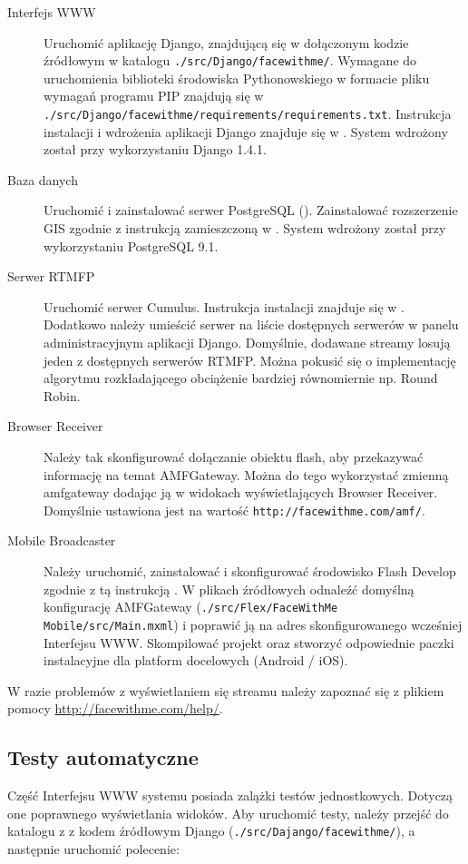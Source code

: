 \begin{description}
    \item[Interfejs WWW] Uruchomić aplikację Django, znajdującą się w dołączonym kodzie źródłowym w katalogu \texttt{./src/Django/facewithme/}. Wymagane do uruchomienia biblioteki środowiska Pythonowskiego w formacie pliku wymagań programu PIP znajdują się w \texttt{./src/Django/facewithme/requirements/requirements.txt}. Instrukcja instalacji i wdrożenia aplikacji Django znajduje się w \cite{DjangoDocs}. System wdrożony został przy wykorzystaniu Django 1.4.1.
    \item[Baza danych] Uruchomić i zainstalować serwer PostgreSQL (\cite{PostgreSQL}). Zainstalować rozszerzenie GIS zgodnie z instrukcją zamieszczoną w \cite{DjangoPostGIS}. System wdrożony został przy wykorzystaniu PostgreSQL 9.1.
    \item[Serwer RTMFP] Uruchomić serwer Cumulus. Instrukcja instalacji znajduje się w \cite{CumulusInstall}. Dodatkowo należy umieścić serwer na liście dostępnych serwerów w panelu administracyjnym aplikacji Django. Domyślnie, dodawane streamy losują jeden z dostępnych serwerów RTMFP. Można pokusić się o implementację algorytmu rozkładającego obciążenie bardziej równomiernie np. Round Robin.
    \item[Browser Receiver] Należy tak skonfigurować dołączanie obiektu flash, aby przekazywać informację na temat AMFGateway. Można do tego wykorzystać zmienną amfgateway dodając ją w widokach wyświetlających Browser Receiver. Domyślnie ustawiona jest na wartość \texttt{http://facewithme.com/amf/}.
    \item[Mobile Broadcaster] Należy uruchomić, zainstalować i skonfigurować środowisko Flash Develop zgodnie z tą instrukcją \cite{flashDevelopConfig}. W plikach źródłowych odnaleźć domyślną konfigurację AMFGateway (\texttt{./src/Flex/FaceWithMe Mobile/src/Main.mxml}) i poprawić ją na adres skonfigurowanego wcześniej Interfejsu WWW. Skompilować projekt oraz stworzyć odpowiednie paczki instalacyjne dla platform docelowych (Android / iOS).
\end{description}

W razie problemów z wyświetlaniem się streamu należy zapoznać się z plikiem pomocy \url{http://facewithme.com/help/}.

\subsection{Testy automatyczne}

Część Interfejsu WWW systemu posiada zalążki testów jednostkowych. Dotyczą one poprawnego wyświetlania widoków. Aby uruchomić testy, należy przejść do katalogu z z kodem źródłowym Django (\texttt{./src/Dajango/facewithme/}), a następnie uruchomić polecenie:

